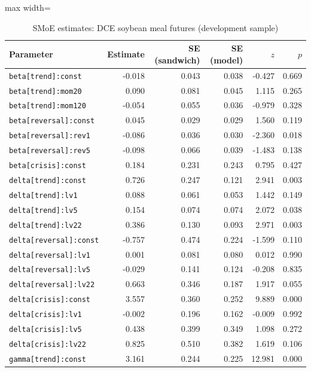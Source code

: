 \begin{table}[!htbp]\centering\scriptsize
\caption{SMoE estimates: DCE soybean meal futures (development sample)}\label{tab:params_m_main}
\begin{adjustbox}{max width=\textwidth}
\begin{tabular}{lrrrrr}
\toprule
Parameter & Estimate & SE (sandwich) & SE (model) & $z$ & $p$\\
\midrule
\texttt{beta[trend]:const} & -0.018 & 0.043 & 0.038 & -0.427 & 0.669\\
\texttt{beta[trend]:mom20} & 0.090 & 0.081 & 0.045 & 1.115 & 0.265\\
\texttt{beta[trend]:mom120} & -0.054 & 0.055 & 0.036 & -0.979 & 0.328\\
\texttt{beta[reversal]:const} & 0.045 & 0.029 & 0.029 & 1.560 & 0.119\\
\texttt{beta[reversal]:rev1} & -0.086 & 0.036 & 0.030 & -2.360 & 0.018\\
\texttt{beta[reversal]:rev5} & -0.098 & 0.066 & 0.039 & -1.483 & 0.138\\
\texttt{beta[crisis]:const} & 0.184 & 0.231 & 0.243 & 0.795 & 0.427\\
\texttt{delta[trend]:const} & 0.726 & 0.247 & 0.121 & 2.941 & 0.003\\
\texttt{delta[trend]:lv1} & 0.088 & 0.061 & 0.053 & 1.442 & 0.149\\
\texttt{delta[trend]:lv5} & 0.154 & 0.074 & 0.074 & 2.072 & 0.038\\
\texttt{delta[trend]:lv22} & 0.386 & 0.130 & 0.093 & 2.971 & 0.003\\
\texttt{delta[reversal]:const} & -0.757 & 0.474 & 0.224 & -1.599 & 0.110\\
\texttt{delta[reversal]:lv1} & 0.001 & 0.081 & 0.080 & 0.012 & 0.990\\
\texttt{delta[reversal]:lv5} & -0.029 & 0.141 & 0.124 & -0.208 & 0.835\\
\texttt{delta[reversal]:lv22} & 0.663 & 0.346 & 0.187 & 1.917 & 0.055\\
\texttt{delta[crisis]:const} & 3.557 & 0.360 & 0.252 & 9.889 & 0.000\\
\texttt{delta[crisis]:lv1} & -0.002 & 0.196 & 0.162 & -0.009 & 0.992\\
\texttt{delta[crisis]:lv5} & 0.438 & 0.399 & 0.349 & 1.098 & 0.272\\
\texttt{delta[crisis]:lv22} & 0.825 & 0.510 & 0.382 & 1.619 & 0.106\\
\texttt{gamma[trend]:const} & 3.161 & 0.244 & 0.225 & 12.981 & 0.000\\

\end{tabular}
\end{adjustbox}
\end{table}
